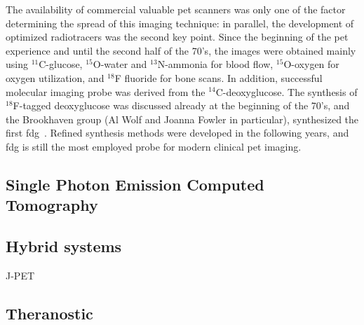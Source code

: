 The availability of commercial valuable \gls{pet} scanners was only one of the factor determining the spread of this imaging technique: in parallel, the development of optimized radiotracers was the second key point. Since the beginning of the \gls{pet} experience and until the second half of the 70's, the images were obtained mainly using $^{11}$C-glucose, $^{15}$O-water and $^{13}$N-ammonia for blood flow, $^{15}$O-oxygen for oxygen utilization, and $^{18}$F fluoride for bone scans. In addition, successful molecular imaging probe was derived from the $^{14}$C-deoxyglucose. The synthesis of $^{18}$F-tagged deoxyglucose was discussed already at the beginning of the 70's, and the Brookhaven group (Al Wolf and Joanna Fowler in particular), synthesized the first \gls{fdg}~\parencite{Ido1978}. Refined synthesis methods were developed in the following years, and \gls{fdg} is still the most employed probe for modern clinical \gls{pet} imaging.


\subsection{Single Photon Emission Computed Tomography}\label{chap1::subsec::SPECT_NM}



\subsection{Hybrid systems}\label{chap1::subsec::Hybrid_NM}

J-PET \parencite{Niedzwiecki2017}

\subsection{Theranostic}\label{chap1::subsec::Theranostic}

\clearpage
